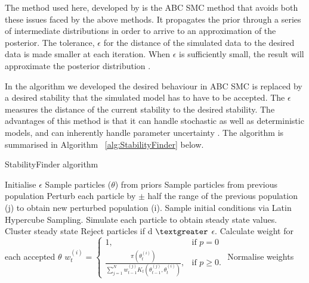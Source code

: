The method used here, developed by \textcite{Toni:2009tr} is the ABC SMC method that avoids both these issues faced by the above methods. It propagates the prior through a series of intermediate distributions in order to arrive to an approximation of the posterior. The tolerance, $\epsilon$ for the distance of the simulated data to the desired data is made smaller at each iteration. When $\epsilon$ is sufficiently small, the result will approximate the posterior distribution \autocite{Toni:2009tr}. 

In the algorithm we developed the desired behaviour in ABC SMC is replaced by a desired stability that the simulated model has to have to be accepted. The $\epsilon$ measures the distance of the current stability to the desired stability. The advantages of this method is that it can handle stochastic as well as deterministic models, and can inherently handle parameter uncertainty \autocite{Barnes:2011hh}. The algorithm is summarised in Algorithm~ \ref{alg:StabilityFinder} below.

\begin{algorithm}[htbp]
\label{alg:StabilityFinder}
\caption{StabilityFinder algorithm}
 \begin{algorithmic}[1]
    \Statex
	\State Initialise $\epsilon$ 
		\State Sample particles ($\theta$) from priors
		\Else
			\State Sample particles from previous population
			\State Perturb each particle by $\pm$ half the range of the previous population (j) to obtain new perturbed population (i).
	\EndIf
	\State Sample initial conditions via Latin Hypercube Sampling.
    \State Simulate each particle to obtain steady state values.
    \State Cluster steady state
	\State Reject particles if d $\textgreater$ $\epsilon$.
    \State Calculate weight for each accepted $\theta$
	\State $w_{t}^{(i)} = \begin{cases} 1, & \mbox{if } p = 0 \\\frac{\pi(\theta_{t}^{(i)})}{\sum_{j=1}^N w_{t-1}^{(j)} K_{t}(\theta_{t-1}^{(j)}, \theta_{t}^{(i)})}, & \mbox{if } p \geq  0. \end{cases}$
	\State Normalise weights
	 
  \end{algorithmic}
\end{algorithm}




